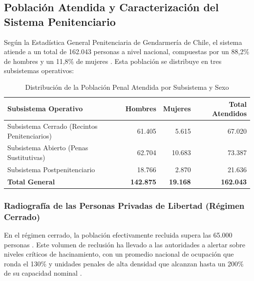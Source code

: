 \subsection{Población Atendida y Caracterización del Sistema Penitenciario}
Según la Estadística General Penitenciaria de Gendarmería de Chile, el sistema atiende a un total de 162.043 personas a nivel nacional, compuestas por un 88,2\% de hombres y un 11,8\% de mujeres \parencite{EstadisticaGeneralPenitenciaria2026}. Esta población se distribuye en tres subsistemas operativos:

\begin{table}[h!]
\centering
\caption{Distribución de la Población Penal Atendida por Subsistema y Sexo}
\label{tab:poblacion_penal}
\vspace{0.2cm}
\small
\begin{tabular}{lrrr}
\toprule
\textbf{Subsistema Operativo} & \textbf{Hombres} & \textbf{Mujeres} & \textbf{Total Atendidos} \\
\midrule
Subsistema Cerrado (Recintos Penitenciarios) & 61.405 & 5.615 & 67.020 \\
Subsistema Abierto (Penas Sustitutivas) & 62.704 & 10.683 & 73.387 \\
Subsistema Postpenitenciario & 18.766 & 2.870 & 21.636 \\
\midrule
\textbf{Total General} & \textbf{142.875} & \textbf{19.168} & \textbf{162.043} \\
\bottomrule
\end{tabular}
\end{table}

\subsubsection{Radiografía de las Personas Privadas de Libertad (Régimen Cerrado)}
En el régimen cerrado, la población efectivamente recluida supera las 65.000 personas \parencite{CaracterizacionPersonasPrivadas2026}. Este volumen de reclusión ha llevado a las autoridades a alertar sobre niveles críticos de hacinamiento, con un promedio nacional de ocupación que ronda el 130\% y unidades penales de alta densidad que alcanzan hasta un 200\% de su capacidad nominal \parencite{EstadisticaGeneralPenitenciaria2026}.

